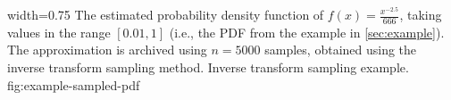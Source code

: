       {width=0.75\textwidth}
      {The estimated probability density function of \(f(x) = \frac{x^{-2.5}}{666}\), taking values in the range \([0.01, 1]\) (i.e., the PDF from the example in \cref{sec:example}). The approximation is archived using \(n = 5000\) samples, obtained using the inverse transform sampling method.}
      {Inverse transform sampling example.}
      {fig:example-sampled-pdf}
